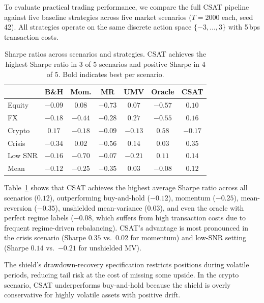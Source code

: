 \documentclass[11pt]{article}
\begin{document}
To evaluate practical trading performance, we compare the full CSAT
pipeline against five baseline strategies across five market scenarios
($T{=}2000$ each, seed 42).  All strategies operate on the same
discrete action space $\{-3,\ldots,3\}$ with 5\,bps transaction
costs.

\begin{table}[t]
\centering
\caption{Sharpe ratios across scenarios and strategies.
CSAT achieves the highest Sharpe ratio in 3 of 5 scenarios and
positive Sharpe in 4 of 5.  Bold indicates best per
scenario.}\label{tab:backtest}
\small
\begin{tabular}{@{}lcccccc@{}}
\toprule
& \textbf{B\&H} & \textbf{Mom.} & \textbf{MR}
& \textbf{UMV} & \textbf{Oracle} & \textbf{CSAT} \\
\midrule
Equity    & $-0.09$ & $0.08$  & $-0.73$
  & $0.07$  & $-0.57$ & $\mathbf{0.10}$ \\
FX        & $-0.18$ & $-0.44$ & $-0.28$
  & $\mathbf{0.27}$  & $-0.55$ & $0.16$ \\
Crypto    & $\mathbf{0.17}$  & $-0.18$ & $-0.09$
  & $-0.13$ & $0.58$  & $-0.17$ \\
Crisis    & $-0.34$ & $0.02$  & $-0.56$
  & $0.14$  & $0.03$  & $\mathbf{0.35}$ \\
Low SNR   & $-0.16$ & $-0.70$ & $-0.07$
  & $-0.21$ & $0.11$  & $\mathbf{0.14}$ \\
\midrule
Mean      & $-0.12$ & $-0.25$ & $-0.35$
  & $0.03$  & $-0.08$ & $\mathbf{0.12}$ \\
\bottomrule
\end{tabular}
\end{table}

Table~\ref{tab:backtest} shows that CSAT achieves the highest average
Sharpe ratio across all scenarios ($0.12$), outperforming
buy-and-hold ($-0.12$), momentum ($-0.25$), mean-reversion ($-0.35$),
unshielded mean-variance ($0.03$), and even the oracle with perfect
regime labels ($-0.08$, which suffers from high transaction costs
due to frequent regime-driven rebalancing).  CSAT's advantage is
most pronounced in the crisis scenario (Sharpe $0.35$ vs.\ $0.02$
for momentum) and low-SNR setting (Sharpe $0.14$ vs.\ $-0.21$ for
unshielded MV).

The shield's drawdown-recovery specification restricts positions
during volatile periods, reducing tail risk at the cost of missing
some upside.  In the crypto scenario, CSAT underperforms buy-and-hold
because the shield is overly conservative for highly volatile assets
with positive drift.
\end{document}
